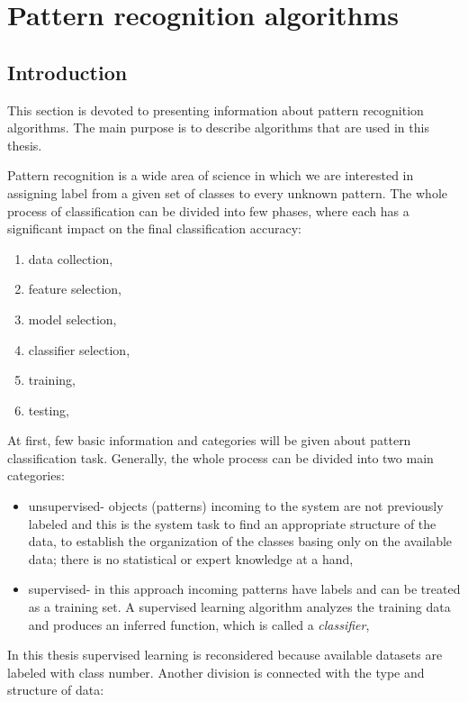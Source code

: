 \section{Pattern recognition algorithms}
\label{cha:Introduction}
\subsection{Introduction}
This section is devoted to presenting information about pattern recognition
algorithms. The main purpose is to describe algorithms that are used in this
thesis. 

Pattern recognition is a wide area of science in which we are interested in
assigning label from a given set of classes to every unknown pattern. The whole 
process of classification can be divided into few phases, where each has a
significant impact on the final classification accuracy:
\begin{enumerate}
    \item data collection,
    \item feature selection,
    \item model selection,
    \item classifier selection,
    \item training,
    \item testing,
\end{enumerate}
At first, few basic information and categories will be given 
about pattern classification task. Generally, the whole process
can be divided into two main categories:
\begin{itemize}
    \item unsupervised- objects (patterns) incoming to the system are not previously
        labeled and this is the system task to find an appropriate structure of
        the data, to establish the organization of the classes basing only on
        the available data; there is no statistical or expert knowledge at a
        hand,
    \item supervised- in this approach incoming patterns have labels and can
        be treated as a training set. A supervised learning algorithm analyzes the 
        training data and produces an inferred function, which is called a \textit{classifier},
\end{itemize}
In this thesis supervised learning is reconsidered because available datasets 
are labeled with class number. Another division is connected with the type and
structure of data:
